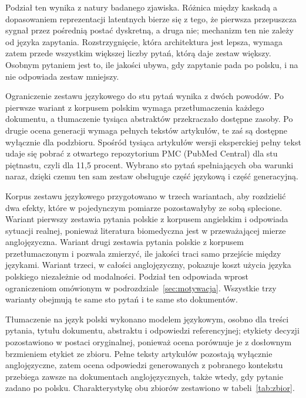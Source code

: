 Podział ten wynika z natury badanego zjawiska. Różnica między kaskadą a dopasowaniem reprezentacji
latentnych bierze się z tego, że pierwsza przepuszcza sygnał przez pośrednią postać dyskretną, a
druga nie; mechanizm ten nie zależy od języka zapytania. Rozstrzygnięcie, która architektura jest
lepsza, wymaga zatem przede wszystkim większej liczby pytań, którą daje zestaw większy. Osobnym
pytaniem jest to, ile jakości ubywa, gdy zapytanie pada po polsku, i na nie odpowiada zestaw
mniejszy.

Ograniczenie zestawu językowego do stu pytań wynika z dwóch powodów. Po pierwsze wariant z korpusem
polskim wymaga przetłumaczenia każdego dokumentu, a tłumaczenie tysiąca abstraktów przekraczało
dostępne zasoby. Po drugie ocena generacji wymaga pełnych tekstów artykułów, te zaś są dostępne
wyłącznie dla podzbioru. Spośród tysiąca artykułów wersji eksperckiej pełny tekst udaje się
pobrać z otwartego repozytorium PMC (PubMed Central) dla stu piętnastu, czyli dla 11,5 procent.
Wybrano sto pytań spełniających oba warunki naraz, dzięki czemu ten sam zestaw obsługuje część
językową i część generacyjną.

Korpus zestawu językowego przygotowano w trzech wariantach, aby rozdzielić dwa efekty, które w
pojedynczym pomiarze pozostawałyby ze sobą splecione. Wariant pierwszy zestawia pytania polskie z
korpusem angielskim i odpowiada sytuacji realnej, ponieważ literatura biomedyczna jest w
przeważającej mierze anglojęzyczna. Wariant drugi zestawia pytania polskie z korpusem
przetłumaczonym i pozwala zmierzyć, ile jakości traci samo przejście między językami. Wariant
trzeci, w całości anglojęzyczny, pokazuje koszt użycia języka polskiego niezależnie od modalności.
Podział ten odpowiada wprost ograniczeniom omówionym w podrozdziale~\ref{sec:motywacja}. Wszystkie
trzy warianty obejmują te same sto pytań i te same sto dokumentów.

Tłumaczenie na język polski wykonano modelem językowym, osobno dla treści pytania, tytułu dokumentu,
abstraktu i odpowiedzi referencyjnej; etykiety decyzji pozostawiono w postaci oryginalnej, ponieważ
ocena porównuje je z dosłownym brzmieniem etykiet ze zbioru. Pełne teksty artykułów pozostają wyłącznie anglojęzyczne,
zatem ocena odpowiedzi generowanych z pobranego kontekstu przebiega zawsze na dokumentach anglojęzycznych,
także wtedy, gdy pytanie zadano po polsku. Charakterystykę obu zbiorów zestawiono w
tabeli~\ref{tab:zbior}.

